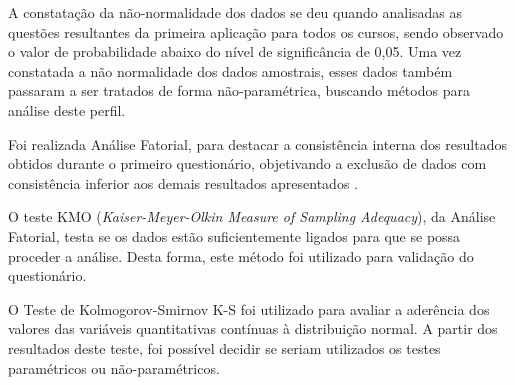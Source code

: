 A constatação da não-normalidade dos dados se deu quando analisadas as questões resultantes da primeira aplicação para todos os cursos, sendo observado o valor de probabilidade abaixo do nível de significância de 0,05. Uma vez constatada a não normalidade dos dados amostrais, esses dados também passaram a ser tratados de forma não-paramétrica, buscando métodos para análise deste perfil.

Foi realizada Análise Fatorial, para destacar a consistência interna dos resultados obtidos durante o primeiro questionário, objetivando a exclusão de dados com consistência inferior aos demais resultados apresentados .

O teste KMO (\textit{Kaiser-Meyer-Olkin Measure of Sampling Adequacy}), da Análise Fatorial, testa se os dados estão suficientemente ligados para que se possa proceder a análise. Desta forma, este método foi utilizado para validação do questionário.

O Teste de Kolmogorov-Smirnov K-S foi utilizado para avaliar a aderência dos valores das variáveis quantitativas contínuas à distribuição normal. A partir dos resultados deste teste, foi possível decidir se seriam utilizados os testes paramétricos ou não-paramétricos.







